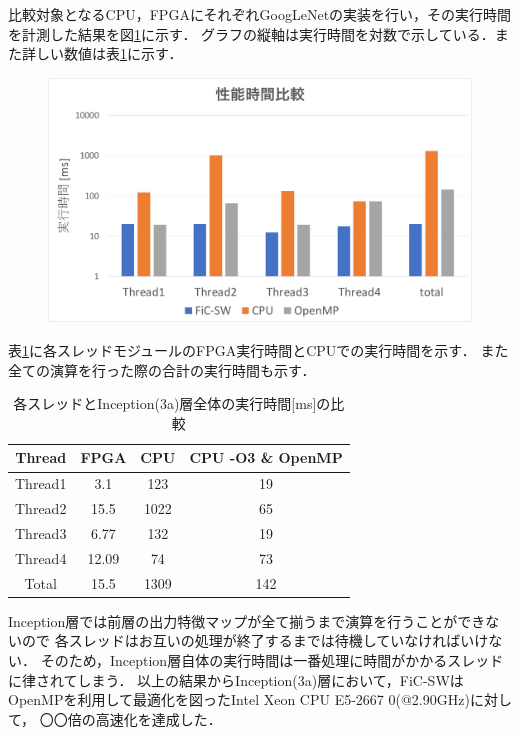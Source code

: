 {比較対象となるCPU，FPGAにそれぞれGoogLeNetの実装を行い，その実行時間を計測した結果を図\ref{fig:exec_graph}に示す．
グラフの縦軸は実行時間を対数で示している．また詳しい数値は表\ref{table:exec_time}に示す．

\begin{figure}[h]
    \centering
    \includegraphics[width=15cm]{./chap7/fig/exec_time.pdf}
    \caption{}
    \label{fig:exec_graph}
\end{figure}

表\ref{table:exec_time}に各スレッドモジュールのFPGA実行時間とCPUでの実行時間を示す．
また全ての演算を行った際の合計の実行時間も示す．

\begin{table}[p]
    \begin{center}
    \caption{各スレッドとInception(3a)層全体の実行時間[ms]の比較}
    \label{table:exec_time}
    \begin{tabular}{|c|c|c|c|} \hline
    \multicolumn{1}{|c|}{Thread} & \multicolumn{1}{|c|}{FPGA} & \multicolumn{1}{|c|}{CPU} & \multicolumn{1}{|c|}{CPU -O3 \& OpenMP} \\ \hline \hline
    Thread1       & 3.1 & 123 & 19 \\ \hline
    Thread2       & 15.5 & 1022 & 65 \\ \hline
    Thread3       & 6.77 & 132 & 19 \\ \hline
    Thread4       & 12.09 & 74 & 73 \\ \hline
    Total         & 15.5 & 1309 & 142 \\ \hline
    \end{tabular}
    \end{center}
\end{table}

Inception層では前層の出力特徴マップが全て揃うまで演算を行うことができないので
各スレッドはお互いの処理が終了するまでは待機していなければいけない．
そのため，Inception層自体の実行時間は一番処理に時間がかかるスレッドに律されてしまう．
以上の結果からInception(3a)層において，FiC-SWはOpenMPを利用して最適化を図ったIntel Xeon CPU E5-2667 0(@2.90GHz)に対して，
〇〇倍の高速化を達成した．
}
